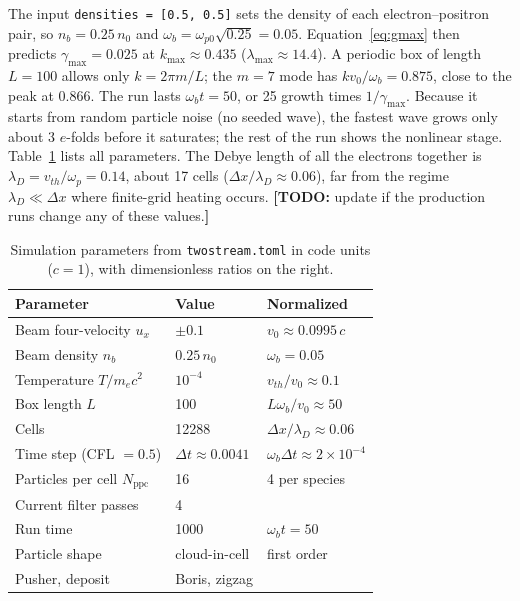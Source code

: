 \documentclass[10pt,twocolumn,letterpaper]{article}
\newcommand{\wb}{\omega_b}            %
\newcommand{\wpe}{\omega_{p}}         %
\newcommand{\vz}{v_0}                 %
\newcommand{\ppc}{N_\mathrm{ppc}}     %
\newif\ifdraft \drafttrue
\newcommand{\todo}[1]{\ifdraft{\color{red}\textbf{[TODO:} #1\textbf{]}}\fi}
\begin{document}
The input \texttt{densities = [0.5, 0.5]} sets the density of each electron--positron pair, so
$n_b=0.25\,n_0$ and $\wb=\omega_{p0}\sqrt{0.25}=0.05$. Equation~\eqref{eq:gmax} then predicts
$\gamma_{\max}=0.025$ at $k_{\max}\approx0.435$ ($\lambda_{\max}\approx14.4$). A periodic box
of length $L=100$ allows only $k=2\pi m/L$; the $m=7$ mode has $k\vz/\wb=0.875$, close to the
peak at $0.866$. The run lasts $\wb t=50$, or 25 growth times $1/\gamma_{\max}$. Because it
starts from random particle noise (no seeded wave), the fastest wave grows only about 3
$e$-folds before it saturates; the rest of the run shows the nonlinear stage. Table~\ref{tab:params} lists all parameters. The Debye length of
all the electrons together is $\lambda_D=v_{th}/\wpe=0.14$, about 17 cells ($\Delta x/\lambda_D\approx0.06$),
far from the regime $\lambda_D\ll\Delta x$ where finite-grid heating occurs.
\todo{update if the production runs change any of these values.}

\begin{table}[t]
  \centering
  \caption{Simulation parameters from \texttt{twostream.toml} in code units ($c=1$), with
  dimensionless ratios on the right.}
  \label{tab:params}
  \small
  \begin{tabular}{@{}lll@{}}
    \toprule
    Parameter & Value & Normalized \\
    \midrule
    Beam four-velocity $u_x$            & $\pm0.1$            & $\vz\approx0.0995\,c$ \\
    Beam density $n_b$                  & $0.25\,n_0$         & $\wb=0.05$ \\
    Temperature $T/m_ec^2$              & $10^{-4}$           & $v_{th}/\vz\approx0.1$ \\
    Box length $L$                      & 100                 & $L\wb/\vz\approx50$ \\
    Cells                               & 12288               & $\Delta x/\lambda_D\approx0.06$ \\
    Time step (CFL $=0.5$)              & $\Delta t\approx0.0041$ & $\wb\Delta t\approx2\times10^{-4}$ \\
    Particles per cell $\ppc$           & 16                  & 4 per species \\
    Current filter passes               & 4                   & \\
    Run time                            & 1000                & $\wb t=50$ \\
    Particle shape                      & cloud-in-cell       & first order \\
    Pusher, deposit                     & Boris, zigzag       & \\
    \bottomrule
  \end{tabular}
\end{table}
\end{document}
